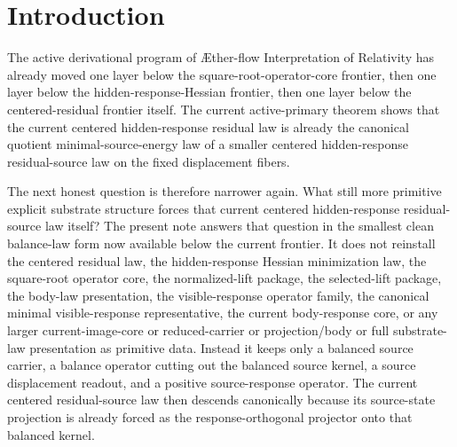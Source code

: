 \documentclass[11pt]{article}
\newcommand{\Aflow}{\AE{}ther-flow}
\newcommand{\TheoryName}{\Aflow{} Interpretation of Relativity}
\newcommand{\CompletedMetric}{g^{\sharp}}
\begin{document}
\begin{abstract}
The benchmark boundary remains unchanged throughout. The one operative metric is still exactly \(\CompletedMetric\), the ordinary matter route is unchanged, there is no second operative metric, the low-energy matter law is not enlarged, and no stronger promotion language is licensed. The remaining honest burden therefore moves below the separate centered hidden-response residual-source law itself to a deeper derivation or justification of the centered hidden-response source-balance law that forces it.
\end{abstract}

\section{Introduction}

The active derivational program of \TheoryName{} has already moved one layer below the square-root-operator-core frontier, then one layer below the hidden-response-Hessian frontier, then one layer below the centered-residual frontier itself. The current active-primary theorem shows that the current centered hidden-response residual law is already the canonical quotient minimal-source-energy law of a smaller centered hidden-response residual-source law on the fixed displacement fibers.

The next honest question is therefore narrower again. What still more primitive explicit substrate structure forces that current centered hidden-response residual-source law itself? The present note answers that question in the smallest clean balance-law form now available below the current frontier. It does not reinstall the centered residual law, the hidden-response Hessian minimization law, the square-root operator core, the normalized-lift package, the selected-lift package, the body-law presentation, the visible-response operator family, the canonical minimal visible-response representative, the current body-response core, or any larger current-image-core or reduced-carrier or projection/body or full substrate-law presentation as primitive data. Instead it keeps only a balanced source carrier, a balance operator cutting out the balanced source kernel, a source displacement readout, and a positive source-response operator. The current centered residual-source law then descends canonically because its source-state projection is already forced as the response-orthogonal projector onto that balanced kernel.
\end{document}
